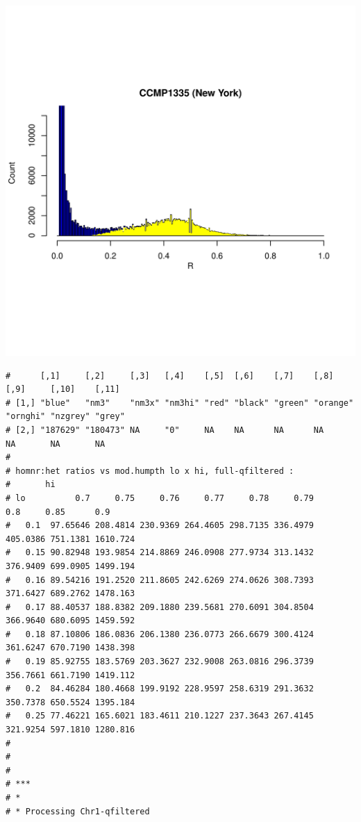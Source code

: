 \documentclass{article}\usepackage[]{graphicx}\usepackage[]{color}
\makeatletter
\def\maxwidth{ %
  \ifdim\Gin@nat@width>\linewidth
    \linewidth
  \else
    \Gin@nat@width
  \fi
}
\newenvironment{kframe}{%
 \def\at@end@of@kframe{}%
 \ifinner\ifhmode%
  \def\at@end@of@kframe{\end{minipage}}%
  \begin{minipage}{\columnwidth}%
 \fi\fi%
 \def\FrameCommand##1{\hskip\@totalleftmargin \hskip-\fboxsep
 \colorbox{shadecolor}{##1}\hskip-\fboxsep
     \hskip-\linewidth \hskip-\@totalleftmargin \hskip\columnwidth}%
 \MakeFramed {\advance\hsize-\width
   \@totalleftmargin\z@ \linewidth\hsize
   \@setminipage}}%
 {\par\unskip\endMakeFramed%
 \at@end@of@kframe}
\newenvironment{knitrout}{}{} %
\makeatother
\begin{document}
\begin{knitrout}
\includegraphics[width=\maxwidth]{FigS7-hwe-histo-figs-knitr/unnamed-chunk-10-41} 
\begin{kframe}\begin{verbatim}
#      [,1]     [,2]     [,3]   [,4]    [,5]  [,6]    [,7]    [,8]     [,9]     [,10]    [,11] 
# [1,] "blue"   "nm3"    "nm3x" "nm3hi" "red" "black" "green" "orange" "ornghi" "nzgrey" "grey"
# [2,] "187629" "180473" NA     "0"     NA    NA      NA      NA       NA       NA       NA
# 
# homnr:het ratios vs mod.humpth lo x hi, full-qfiltered :
#       hi
# lo          0.7     0.75     0.76     0.77     0.78     0.79      0.8     0.85      0.9
#   0.1  97.65646 208.4814 230.9369 264.4605 298.7135 336.4979 405.0386 751.1381 1610.724
#   0.15 90.82948 193.9854 214.8869 246.0908 277.9734 313.1432 376.9409 699.0905 1499.194
#   0.16 89.54216 191.2520 211.8605 242.6269 274.0626 308.7393 371.6427 689.2762 1478.163
#   0.17 88.40537 188.8382 209.1880 239.5681 270.6091 304.8504 366.9640 680.6095 1459.592
#   0.18 87.10806 186.0836 206.1380 236.0773 266.6679 300.4124 361.6247 670.7190 1438.398
#   0.19 85.92755 183.5769 203.3627 232.9008 263.0816 296.3739 356.7661 661.7190 1419.112
#   0.2  84.46284 180.4668 199.9192 228.9597 258.6319 291.3632 350.7378 650.5524 1395.184
#   0.25 77.46221 165.6021 183.4611 210.1227 237.3643 267.4145 321.9254 597.1810 1280.816
# 
# 
# 
# ***
# *
# * Processing Chr1-qfiltered 

\end{verbatim}
\end{kframe}
\end{knitrout}
\end{document}
